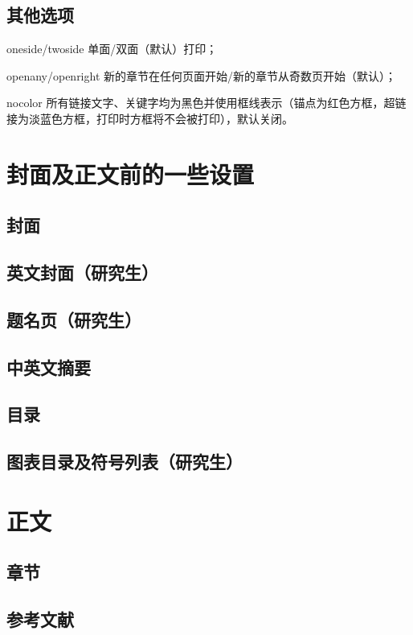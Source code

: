         \subsection{其他选项}
        \begin{description}
            \item{oneside\slash twoside} 单面\slash 双面（默认）打印；
            \item{openany\slash openright} 新的章节在任何页面开始\slash 新的章节从奇数页开始（默认）；
            \item{nocolor} 所有链接文字、关键字均为黑色并使用框线表示（锚点为红色方框，超链接为淡蓝色方框，打印时方框将不会被打印），默认关闭。
        \end{description}

    \section{封面及正文前的一些设置}
        \subsection{封面}
        \subsection{英文封面（研究生）}
        \subsection{题名页（研究生）}
        \subsection{中英文摘要}
        \subsection{目录}
        \subsection{图表目录及符号列表（研究生）}
    \section{正文}
        \subsection{章节}
        \subsection{参考文献}
